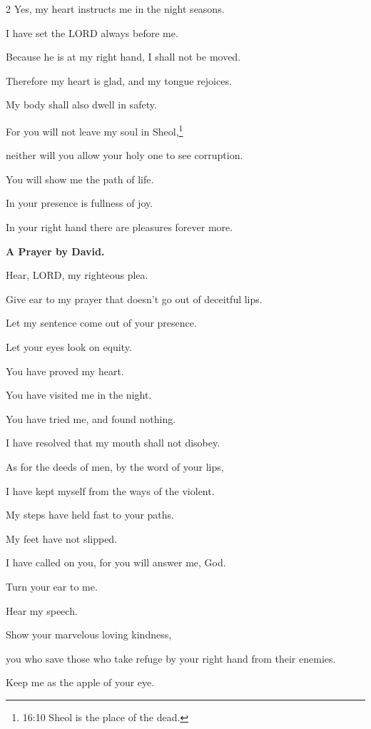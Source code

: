 \begin{multicols}{2}
	Yes, my heart instructs me in the night seasons.
	
	
	\myverse{}I have set the LORD always before me.
	
	Because he is at my right hand, I shall not be moved.
	
	
	\myverse{}Therefore my heart is glad, and my tongue rejoices.
	
	My body shall also dwell in safety.
	
	
	\myverse{}For you will not leave my soul in Sheol,\footnote{16:10 Sheol is the place of the dead.}
	
	neither will you allow your holy one to see corruption.
	
	
	\myverse{}You will show me the path of life.
	
	In your presence is fullness of joy.
	
	In your right hand there are pleasures forever more.
	
	
	\mychapter{}\textbf{A Prayer by David.}
	
	\quad \myverse*{}Hear, LORD, my righteous plea.
	
	Give ear to my prayer that doesn’t go out of deceitful lips.
	
	
	\myverse{}Let my sentence come out of your presence.
	
	Let your eyes look on equity.
	
	
	\myverse{}You have proved my heart.
	
	You have visited me in the night.
	
	You have tried me, and found nothing.
	
	I have resolved that my mouth shall not disobey.
	
	
	\myverse{}As for the deeds of men, by the word of your lips,
	
	I have kept myself from the ways of the violent.
	
	
	\myverse{}My steps have held fast to your paths.
	
	My feet have not slipped.
	
	
	\myverse{}I have called on you, for you will answer me, God.
	
	Turn your ear to me.
	
	Hear my speech.
	
	
	\myverse{}Show your marvelous loving kindness,
	
	you who save those who take refuge by your right hand from their enemies.
	
	
	\myverse{}Keep me as the apple of your eye.
	

\end{multicols}

